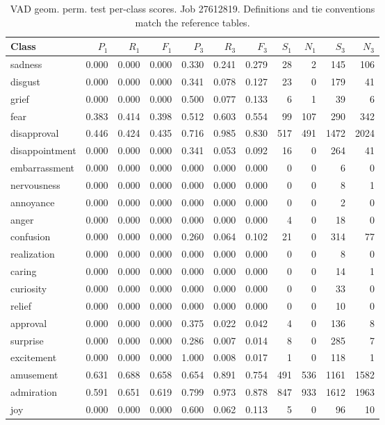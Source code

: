 \begin{table}[!htbp]
\centering
\scriptsize
\setlength{\tabcolsep}{5pt}
\begin{tabular}{lrrrrrrrrrr}
\toprule
Class & $P_1$ & $R_1$ & $F_1$ & $P_3$ & $R_3$ & $F_3$ & $S_1$ & $N_1$ & $S_3$ & $N_3$ \\
\midrule
sadness & 0.000 & 0.000 & 0.000 & 0.330 & 0.241 & 0.279 & 28 & 2 & 145 & 106 \\
disgust & 0.000 & 0.000 & 0.000 & 0.341 & 0.078 & 0.127 & 23 & 0 & 179 & 41 \\
grief & 0.000 & 0.000 & 0.000 & 0.500 & 0.077 & 0.133 & 6 & 1 & 39 & 6 \\
fear & 0.383 & 0.414 & 0.398 & 0.512 & 0.603 & 0.554 & 99 & 107 & 290 & 342 \\
disapproval & 0.446 & 0.424 & 0.435 & 0.716 & 0.985 & 0.830 & 517 & 491 & 1472 & 2024 \\
disappointment & 0.000 & 0.000 & 0.000 & 0.341 & 0.053 & 0.092 & 16 & 0 & 264 & 41 \\
embarrassment & 0.000 & 0.000 & 0.000 & 0.000 & 0.000 & 0.000 & 0 & 0 & 6 & 0 \\
nervousness & 0.000 & 0.000 & 0.000 & 0.000 & 0.000 & 0.000 & 0 & 0 & 8 & 1 \\
annoyance & 0.000 & 0.000 & 0.000 & 0.000 & 0.000 & 0.000 & 0 & 0 & 2 & 0 \\
anger & 0.000 & 0.000 & 0.000 & 0.000 & 0.000 & 0.000 & 4 & 0 & 18 & 0 \\
confusion & 0.000 & 0.000 & 0.000 & 0.260 & 0.064 & 0.102 & 21 & 0 & 314 & 77 \\
realization & 0.000 & 0.000 & 0.000 & 0.000 & 0.000 & 0.000 & 0 & 0 & 8 & 0 \\
caring & 0.000 & 0.000 & 0.000 & 0.000 & 0.000 & 0.000 & 0 & 0 & 14 & 1 \\
curiosity & 0.000 & 0.000 & 0.000 & 0.000 & 0.000 & 0.000 & 0 & 0 & 33 & 0 \\
relief & 0.000 & 0.000 & 0.000 & 0.000 & 0.000 & 0.000 & 0 & 0 & 10 & 0 \\
approval & 0.000 & 0.000 & 0.000 & 0.375 & 0.022 & 0.042 & 4 & 0 & 136 & 8 \\
surprise & 0.000 & 0.000 & 0.000 & 0.286 & 0.007 & 0.014 & 8 & 0 & 285 & 7 \\
excitement & 0.000 & 0.000 & 0.000 & 1.000 & 0.008 & 0.017 & 1 & 0 & 118 & 1 \\
amusement & 0.631 & 0.688 & 0.658 & 0.654 & 0.891 & 0.754 & 491 & 536 & 1161 & 1582 \\
admiration & 0.591 & 0.651 & 0.619 & 0.799 & 0.973 & 0.878 & 847 & 933 & 1612 & 1963 \\
joy & 0.000 & 0.000 & 0.000 & 0.600 & 0.062 & 0.113 & 5 & 0 & 96 & 10 \\
\bottomrule
\end{tabular}
\caption{VAD geom. perm. test per-class scores. Job 27612819. Definitions and tie conventions match the reference tables.}
\label{tab:classes-b_vad_geometry_permuted}
\end{table}
